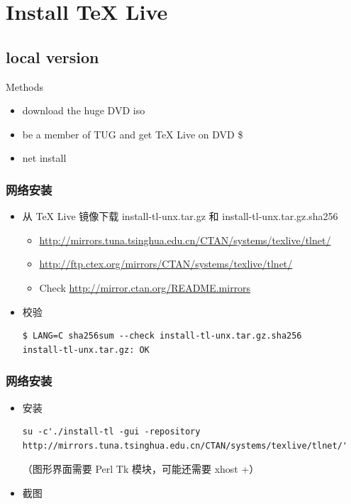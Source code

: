 \documentclass{beamer}
\def\TeXLive{\TeX{} Live\xspace}
\let\TL=\TeXLive
\begin{document}
\section{Install \TL}
\subsection{local version}
\begin{frame}{Methods}
  \begin{itemize}
    \item download the huge DVD iso \frownie
    \item be a member of TUG and get \TL on DVD \$
      \pause
    \item net install \smiley
  \end{itemize}
\end{frame}

\begin{frame}[fragile]
  \frametitle{网络安装}
  \begin{itemize}
    \item 
从 \TeXLive 镜像下载
install-tl-unx.tar.gz
和
install-tl-unx.tar.gz.sha256
\begin{itemize} %
  \item \url{http://mirrors.tuna.tsinghua.edu.cn/CTAN/systems/texlive/tlnet/}
  \item \url{http://ftp.ctex.org/mirrors/CTAN/systems/texlive/tlnet/}
  \item Check \url{http://mirror.ctan.org/README.mirrors}
\end{itemize}

\item 校验
\begin{lstlisting}
$ LANG=C sha256sum --check install-tl-unx.tar.gz.sha256 
install-tl-unx.tar.gz: OK
\end{lstlisting}

  \end{itemize}
\end{frame}

\begin{frame}[fragile]
  \frametitle{网络安装}
  \begin{itemize}
    \item 安装
      \begin{lstlisting}
su -c'./install-tl -gui -repository http://mirrors.tuna.tsinghua.edu.cn/CTAN/systems/texlive/tlnet/'
      \end{lstlisting}

（图形界面需要 Perl Tk 模块，可能还需要 xhost +）

\item 截图
\end{itemize}
\end{frame}
\end{document}

